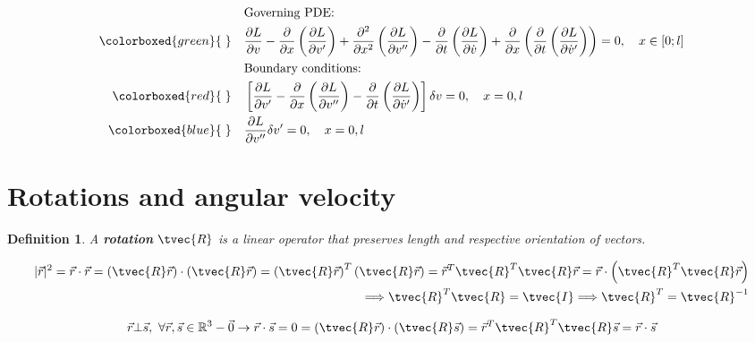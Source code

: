 \documentclass[10pt,a4paper]{scrartcl}
\newtheorem{define}{Definition}
\begin{document}
\begin{multicols*}{2}
\begin{align*}
&\text{Governing PDE:}\\
\colorboxed{green}{\phantom{|}}\quad& \frac{\partial L}{\partial v}-\frac{\partial}{\partial x}\left(\frac{\partial L}{\partial v'}\right)+\frac{\partial^2}{\partial x^2}\left(\frac{\partial L}{\partial v''}\right)-\frac{\partial }{\partial t}\left(\frac{\partial L}{\partial \dot{v}}\right)+\frac{\partial }{\partial x}\left(\frac{\partial }{\partial t}\left(\frac{\partial L}{\partial\dot{v}'}\right)\right)=0,\quad x\in[0;l]\\
&\text{Boundary conditions:}\\
\colorboxed{red}{\phantom{|}}\quad& \left[\frac{\partial L}{\partial v'}-\frac{\partial}{\partial x}\left(\frac{\partial L}{\partial v''}\right)-\frac{\partial}{\partial t}\left(\frac{\partial L}{\partial \dot{v}'}\right)\right]\delta v=0,\quad x=0,l\\
\colorboxed{blue}{\phantom{|} }\quad& \frac{\partial L}{\partial v''}\delta v'=0,\quad x=0,l
\end{align*}

\section{Rotations and angular velocity}

\begin{define}
A \textbf{rotation} $\tvec{R}$ is a linear operator that preserves length and respective orientation of vectors.
\end{define}



\begin{align*}
|\vec{r}|^2=\vec{r}\cdot\vec{r}=\left(\tvec{R}\vec{r}\right)\cdot\left(\tvec{R}\vec{r}\right)=\left(\tvec{R}\vec{r}\right)^T\left(\tvec{R}\vec{r}\right)=\vec{r}^T\tvec{R}^T\tvec{R}\vec{r}=\vec{r}\cdot\left(\tvec{R}^T\tvec{R}\vec{r}\right)\\
\Longrightarrow\tvec{R}^T\tvec{R}=\tvec{I}\Longrightarrow\tvec{R}^T=\tvec{R}^{-1}
\end{align*}


\begin{align*}
\vec{r}\bot\vec{s},\ \forall \vec{r},\vec{s}\in\mathbb{R}^3-\vec{0}\rightarrow\vec{r}\cdot\vec{s}=0=\left(\tvec{R}\vec{r}\right)\cdot\left(\tvec{R}\vec{s}\right)=\vec{r}^T\tvec{R}^T\tvec{R}\vec{s}=\vec{r}\cdot\vec{s}
\end{align*}


\end{multicols*}
\end{document}
